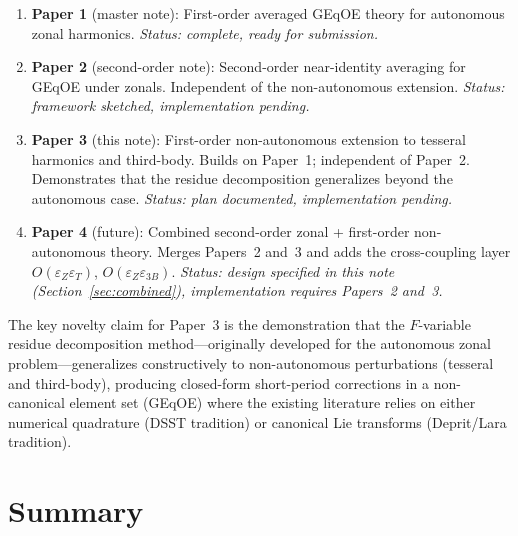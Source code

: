 \documentclass[11pt]{article}
\newcommand{\eps}{\varepsilon}
\begin{document}
\begin{enumerate}
\item \textbf{Paper 1} (master note): First-order averaged GEqOE theory
for autonomous zonal harmonics. \emph{Status: complete, ready for
submission.}

\item \textbf{Paper 2} (second-order note): Second-order near-identity
averaging for GEqOE under zonals. Independent of the non-autonomous
extension. \emph{Status: framework sketched, implementation pending.}

\item \textbf{Paper 3} (this note): First-order non-autonomous extension
to tesseral harmonics and third-body. Builds on Paper~1; independent of
Paper~2. Demonstrates that the residue decomposition generalizes beyond
the autonomous case. \emph{Status: plan documented, implementation
pending.}

\item \textbf{Paper 4} (future): Combined second-order zonal + first-order
non-autonomous theory. Merges Papers~2 and~3 and adds the cross-coupling
layer $O(\eps_Z \eps_T)$, $O(\eps_Z \eps_{3B})$. \emph{Status: design
specified in this note (Section~\ref{sec:combined}), implementation
requires Papers~2 and~3.}
\end{enumerate}

The key novelty claim for Paper~3 is the demonstration that the
$F$-variable residue decomposition method---originally developed for the
autonomous zonal problem---generalizes constructively to non-autonomous
perturbations (tesseral and third-body), producing closed-form
short-period corrections in a non-canonical element set (GEqOE) where
the existing literature relies on either numerical quadrature
(DSST tradition) or canonical Lie transforms (Deprit/Lara tradition).


\section{Summary}
\label{sec:summary}
\end{document}
